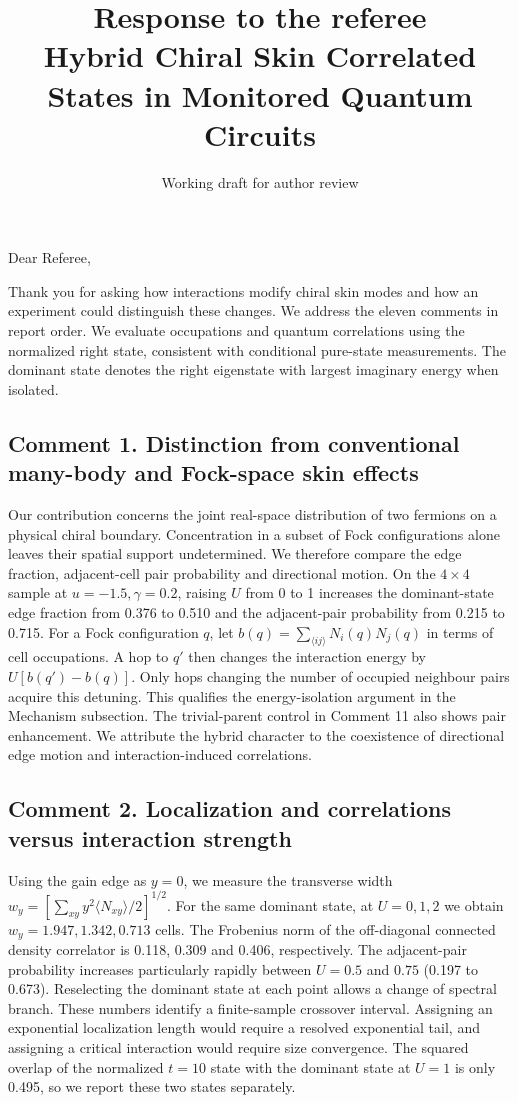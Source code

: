 \documentclass[11pt]{article}
\title{Response to the referee\\\large Hybrid Chiral Skin Correlated States in Monitored Quantum Circuits}
\date{Working draft for author review}
\newcommand{\issue}[2]{\subsection*{Comment #1. #2}}
\begin{document}
\maketitle
Dear Referee,

Thank you for asking how interactions modify chiral skin modes and how an experiment could distinguish these changes. We address the eleven comments in report order. We evaluate occupations and quantum correlations using the normalized right state, consistent with conditional pure-state measurements. The dominant state denotes the right eigenstate with largest imaginary energy when isolated.

\issue{1}{Distinction from conventional many-body and Fock-space skin effects}
Our contribution concerns the joint real-space distribution of two fermions on a physical chiral boundary. Concentration in a subset of Fock configurations alone leaves their spatial support undetermined. We therefore compare the edge fraction, adjacent-cell pair probability and directional motion. On the $4\times4$ sample at $u=-1.5,\gamma=0.2$, raising $U$ from 0 to 1 increases the dominant-state edge fraction from 0.376 to 0.510 and the adjacent-pair probability from 0.215 to 0.715. For a Fock configuration $q$, let $b(q)=\sum_{\langle ij\rangle}N_i(q)N_j(q)$ in terms of cell occupations. A hop to $q'$ then changes the interaction energy by $U[b(q')-b(q)]$. Only hops changing the number of occupied neighbour pairs acquire this detuning. This qualifies the energy-isolation argument in the Mechanism subsection. The trivial-parent control in Comment 11 also shows pair enhancement. We attribute the hybrid character to the coexistence of directional edge motion and interaction-induced correlations.

\issue{2}{Localization and correlations versus interaction strength}
Using the gain edge as $y=0$, we measure the transverse width $w_y=[\sum_{xy} y^2\langle N_{xy}\rangle/2]^{1/2}$. For the same dominant state, at $U=0,1,2$ we obtain $w_y=1.947,1.342,0.713$ cells. The Frobenius norm of the off-diagonal connected density correlator is 0.118, 0.309 and 0.406, respectively. The adjacent-pair probability increases particularly rapidly between $U=0.5$ and $0.75$ (0.197 to 0.673). Reselecting the dominant state at each point allows a change of spectral branch. These numbers identify a finite-sample crossover interval. Assigning an exponential localization length would require a resolved exponential tail, and assigning a critical interaction would require size convergence. The squared overlap of the normalized $t=10$ state with the dominant state at $U=1$ is only 0.495, so we report these two states separately.
\end{document}
